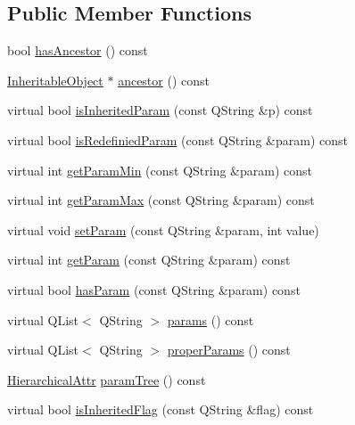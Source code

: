 \subsection*{\-Public \-Member \-Functions}
\begin{DoxyCompactItemize}
\item 
bool \hyperlink{class_inheritable_object_adcbc6cc43d5f999e9c7758f2c15d06da}{has\-Ancestor} () const 
\item 
\hyperlink{class_inheritable_object}{\-Inheritable\-Object} $\ast$ \hyperlink{class_inheritable_object_ac87a3c55ca4be252c527a29fe162bb15}{ancestor} () const 
\item 
virtual bool \hyperlink{class_inheritable_object_abc198984005821502425085aeb16c754}{is\-Inherited\-Param} (const \-Q\-String \&p) const 
\item 
virtual bool \hyperlink{class_inheritable_object_abe7d327b43331cd5532c1c8228d63a4e}{is\-Redefinied\-Param} (const \-Q\-String \&param) const 
\item 
virtual int \hyperlink{class_inheritable_object_aa2f45895bcf254ef252428980c06da83}{get\-Param\-Min} (const \-Q\-String \&param) const 
\item 
virtual int \hyperlink{class_inheritable_object_a1edd964a7d01692414ef90f3e88c6a5e}{get\-Param\-Max} (const \-Q\-String \&param) const 
\item 
virtual void \hyperlink{class_inheritable_object_af3ebe709ead7a86ed2eaee602f1ffb67}{set\-Param} (const \-Q\-String \&param, int value)
\item 
virtual int \hyperlink{class_inheritable_object_a85fdb93d54f9e561acf5effa8012abb8}{get\-Param} (const \-Q\-String \&param) const 
\item 
virtual bool \hyperlink{class_inheritable_object_a1f6ee8bcd7cb2e92e260d535518778fc}{has\-Param} (const \-Q\-String \&param) const 
\item 
virtual \-Q\-List$<$ \-Q\-String $>$ \hyperlink{class_inheritable_object_a48233a132cc55bce9f73ca6d2dc7d657}{params} () const 
\item 
virtual \-Q\-List$<$ \-Q\-String $>$ \hyperlink{class_inheritable_object_a6b7782357091c81101b20fb6ca669eb0}{proper\-Params} () const 
\item 
\hyperlink{gameobject_8h_a2679b210263ad72f002dee6909ea222b}{\-Hierarchical\-Attr} \hyperlink{class_inheritable_object_a6bbe68c492529414211ddc8704640d13}{param\-Tree} () const 
\item 
virtual bool \hyperlink{class_inheritable_object_abaae23f6ff5781212a88a5faa4f9ed44}{is\-Inherited\-Flag} (const \-Q\-String \&flag) const 

\end{DoxyCompactItemize}
